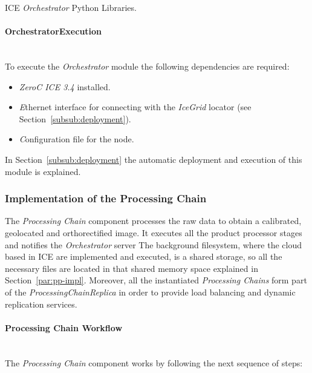 \begin{table}[hp]
  \centering
  {\small
  
  }
  \caption{ICE \emph{Orchestrator} Python Libraries.}
  \label{table:orches-second-libraries}
\end{table}

\paragraph{OrchestratorExecution}~\\

To execute the \emph{Orchestrator} module the following dependencies
are required:
\begin{itemize}
\item \emph{ZeroC ICE 3.4} installed.
\item \emph Ethernet interface for connecting with the \emph{IceGrid} locator (see Section~\ref{subsub:deployment}).
\item \emph Configuration file for the node.
\end{itemize}
 In Section~\ref{subsub:deployment} the
  automatic deployment and execution of this module is explained. 

\subsubsection{Implementation of the  Processing Chain}

The \emph{Processing Chain} component processes the raw data to obtain a calibrated,
geolocated and orthorectified image. It executes all the product processor stages and notifies the
\emph{Orchestrator} server The background filesystem, where the cloud based in
ICE are implemented and executed, is a shared storage, so all the necessary files are
located in that shared memory space  explained in Section~\ref{par:pp-impl}. Moreover, all the instantiated \emph{Processing Chains} form part of the
\emph{ProcessingChainReplica} in order to provide load balancing and dynamic
replication services. 


\paragraph{Processing Chain Workflow}~\\

The \emph{Processing Chain} component works by following the next sequence of steps:

